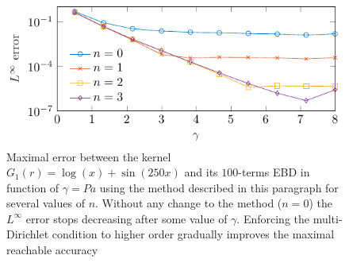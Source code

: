 \documentclass[main]{subfiles}
\begin{document}
\begin{figure}[t]	
	\centering
	\includegraphics[scale = 0.8]{EBD/figs/LinfVsGamma_arbitraryKern}
	\caption{Maximal error between the kernel $G_1(r) =  \log(x) + \sin(250x)$ and its $100$-terms EBD in function of $\gamma = Pa$ using the method described in this paragraph for several values of $n$. Without any change to the method ($n = 0$) the $L^\infty$ error stops decreasing after some value of $\gamma$. Enforcing the multi-Dirichlet condition to higher order gradually improves the maximal reachable accuracy}
	\label{figArbitraryKernel}
\end{figure}																									
\end{document}
